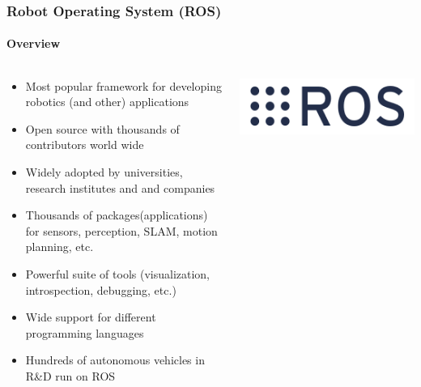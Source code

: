 \begin{frame}
\frametitle{Robot Operating System (ROS)}
\framesubtitle{Overview}
\begin{columns}[]
    \begin{column}{0.7\textwidth}
        \begin{itemize}
            \item Most popular framework for developing robotics (and other)
                applications
            \item Open source with thousands of contributors world wide
            \item Widely adopted by universities, research institutes and
                and companies
            \item Thousands of packages\footnotemark[1] (applications) for
                sensors, perception, SLAM, motion planning, etc.
            \item Powerful suite of tools (visualization, introspection,
                debugging, etc.)
            \item Wide support for different programming languages
            \item Hundreds of autonomous vehicles in R\&D run on ROS
        \end{itemize}
    \end{column}
    \begin{column}{0.3\textwidth}
        \centering
        \includegraphics[width=\textwidth]{images/logo_ros.png}
    \end{column}
\end{columns}
\end{frame}

